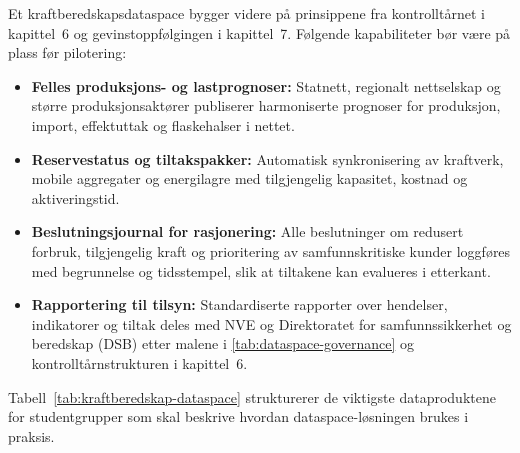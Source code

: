 Et kraftberedskapsdataspace bygger videre på prinsippene fra kontrolltårnet i kapittel~6 og gevinstoppfølgingen i kapittel~7. Følgende kapabiliteter bør være på plass før pilotering:
\begin{itemize}
    \item \textbf{Felles produksjons- og lastprognoser:} Statnett, regionalt nettselskap og større produksjonsaktører publiserer harmoniserte prognoser for produksjon, import, effektuttak og flaskehalser i nettet.
    \item \textbf{Reservestatus og tiltakspakker:} Automatisk synkronisering av kraftverk, mobile aggregater og energilagre med tilgjengelig kapasitet, kostnad og aktiveringstid.
    \item \textbf{Beslutningsjournal for rasjonering:} Alle beslutninger om redusert forbruk, tilgjengelig kraft og prioritering av samfunnskritiske kunder loggføres med begrunnelse og tidsstempel, slik at tiltakene kan evalueres i etterkant.
    \item \textbf{Rapportering til tilsyn:} Standardiserte rapporter over hendelser, indikatorer og tiltak deles med NVE og Direktoratet for samfunnssikkerhet og beredskap (DSB) etter malene i \autoref{tab:dataspace-governance} og kontrolltårnstrukturen i kapittel~6.
\end{itemize}

Tabell~\ref{tab:kraftberedskap-dataspace} strukturerer de viktigste dataproduktene for studentgrupper som skal beskrive hvordan dataspace-løsningen brukes i praksis.

